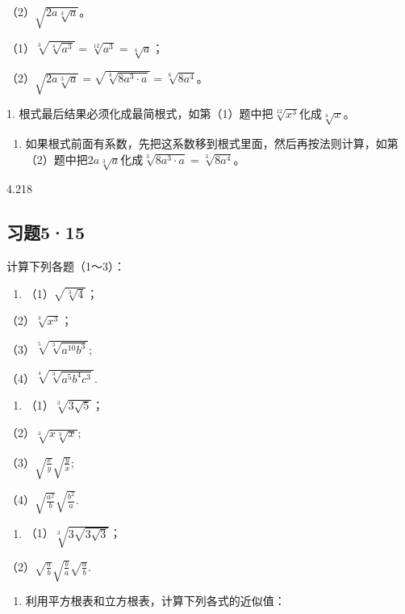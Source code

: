 （2）\(\sqrt{2a\sqrt[3]{a}}\)。

（1）\(\sqrt[3]{\sqrt[4]{a^3}} = \sqrt[12]{a^3} = \sqrt[4]{a}\)；

（2）\(\sqrt{2a\sqrt[3]{a}} = \sqrt{\sqrt[3]{8a^3 \cdot a}} = \sqrt[6]{8a^4}\)。

 1.
根式最后结果必须化成最简根式，如第（1）题中把\(\sqrt[12]{x^3}\)化成\(\sqrt[4]{x}\)。

\begin{enumerate}[start=2]
\item
  如果根式前面有系数，先把这系数移到根式里面，然后再按法则计算，如第（2）题中把\(2a\sqrt[3]{a}\)化成\(\sqrt[3]{8a^3 \cdot a} = \sqrt[3]{8a^4}\)。
\end{enumerate}

4.218

\subsection{习题5·15}

计算下列各题（1～3）：

\begin{enumerate}
\item
  （1）\(\sqrt{\sqrt[3]{4}}\)；
\end{enumerate}

（2）\(\sqrt[3]{x^3}\)；

（3）\(\sqrt[5]{\sqrt[3]{a^{10}b^3}};\)

（4）\(\sqrt[4]{\sqrt[3]{a^{5}b^4c^3}}.\)

\begin{enumerate}[start=2]
\item
  （1）\(\sqrt[3]{3\sqrt{5}}\)；
\end{enumerate}

（2）\(\sqrt[3]{x\sqrt[3]{x}};\)

（3）\(\sqrt{\frac{x}{y}}\sqrt{\frac{y}{x}};\)

（4）\(\sqrt{\frac{a^2}{b}}\sqrt{\frac{b^2}{a}}.\)

\begin{enumerate}[start=3]
\item
  （1）\(\sqrt[3]{3\sqrt{3\sqrt{3}}}\)；
\end{enumerate}

（2）\(\sqrt{\frac{a}{b}}\sqrt{\frac{b}{a}}\sqrt{\frac{a}{b}}.\)

\begin{enumerate}[start=4]
\item
  利用平方根表和立方根表，计算下列各式的近似值：
\end{enumerate}

